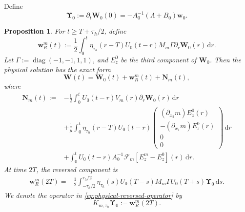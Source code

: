 \documentclass[11pt,reqno]{amsart}
\newtheorem{proposition}{Proposition}[section]
\newcommand{\dd}{\,\mathrm{d}}
\newcommand{\diag}{\operatorname{diag}}
\numberwithin{equation}{section}
\begin{document}
Define
\begin{equation*}
\bm{\Upsilon}_0:=\partial_t\bm{W}_0(0) =-A_0^{-1}(\Lambda+B_0)\bm{w}_0.
\end{equation*}

\begin{proposition}\label{prop:backpropagating}
For $t\geq T+\tau_h/2$, define
\begin{equation}\label{eq:wR-tailored}
\bm{w}_R^m(t):=\frac12\int_0^t \eta_{\tau_h}(r-T)U_0(t-r) M_m\Gamma\partial_r\bm{W}_0(r)\dd r.
\end{equation}
Let $\Gamma:=\diag(-1,-1,1,1)$, and $E_z^0$ be the third component of $\bm{W}_0$. Then the physical solution has the exact form
\begin{equation}\label{eq:physical-field-reversed-split}
\bm{W}(t)=\bm{W}_0(t)+\bm{w}_R^m(t)+\bm{N}_m(t),
\end{equation}
where
\begin{align}\label{eq:physical-remainder-definition}
\bm{N}_m(t):=&-\frac12\int_0^t U_0(t-r)V_m(r)\partial_r\bm{W}_0(r)\dd r\nonumber\\
&+\frac1\mu\int_0^t\eta_{\tau_h}(r-T)U_0(t-r)
\begin{pmatrix}
(\partial_{x_2}m)E_z^0(r)\\
-(\partial_{x_1}m)E_z^0(r)\\
0\\0
\end{pmatrix}\dd r\nonumber\\
&+\int_0^tU_0(t-r)A_0^{-1}
\bm{\mathcal F}_m[E_z^m-E_z^0](r)\dd r.
\end{align}
At time $2T$, the reversed component is
\begin{equation}\label{eq:physical-reversed-operator}
\begin{aligned}
\bm{w}_R^m(2T) = &\frac12\int_{-\tau_h/2}^{\tau_h/2}\eta_{\tau_h}(s) U_0(T-s)M_m \Gamma U_0(T+s)\bm{\Upsilon}_0\dd s.
\end{aligned}
\end{equation}
We denote the operator in \eqref{eq:physical-reversed-operator} by
\begin{equation}\label{eq:Kmdef}
K_{m,\tau_h}\bm{\Upsilon}_0:=\bm{w}_R^m(2T).
\end{equation}
\end{proposition}
\end{document}
